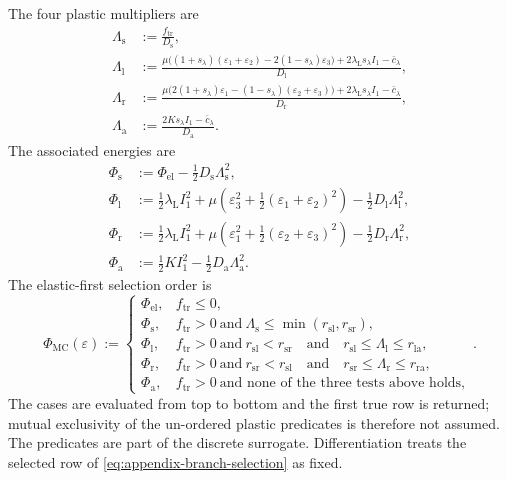 The four plastic multipliers are
\begin{align}
  \Lambda_{\mathrm s}
  &:=\frac{f_{\mathrm{tr}}}{D_{\mathrm s}},
  \nonumber\\
  \Lambda_{\mathrm l}
  &:=\frac{
    \mu\bigl((1+s_\lambda)(\varepsilon_1+\varepsilon_2)
    -2(1-s_\lambda)\varepsilon_3\bigr)
    +2\lambda_{\mathrm L}s_\lambda I_1-\bar c_\lambda}
    {D_{\mathrm l}},
  \nonumber\\
  \Lambda_{\mathrm r}
  &:=\frac{
    \mu\bigl(2(1+s_\lambda)\varepsilon_1
    -(1-s_\lambda)(\varepsilon_2+\varepsilon_3)\bigr)
    +2\lambda_{\mathrm L}s_\lambda I_1-\bar c_\lambda}
    {D_{\mathrm r}},
  \nonumber\\
  \Lambda_{\mathrm a}
  &:=\frac{2Ks_\lambda I_1-\bar c_\lambda}{D_{\mathrm a}}.
  \label{eq:appendix-branch-multipliers}
\end{align}
The associated energies are
\begin{align}
  \Phi_{\mathrm s}
  &:=\Phi_{\mathrm{el}}
    -\frac12D_{\mathrm s}\Lambda_{\mathrm s}^2,
  \nonumber\\
  \Phi_{\mathrm l}
  &:=\frac12\lambda_{\mathrm L}I_1^2
    +\mu\left(\varepsilon_3^2
      +\frac12(\varepsilon_1+\varepsilon_2)^2\right)
    -\frac12D_{\mathrm l}\Lambda_{\mathrm l}^2,
  \nonumber\\
  \Phi_{\mathrm r}
  &:=\frac12\lambda_{\mathrm L}I_1^2
    +\mu\left(\varepsilon_1^2
      +\frac12(\varepsilon_2+\varepsilon_3)^2\right)
    -\frac12D_{\mathrm r}\Lambda_{\mathrm r}^2,
  \nonumber\\
  \Phi_{\mathrm a}
  &:=\frac12KI_1^2
    -\frac12D_{\mathrm a}\Lambda_{\mathrm a}^2.
  \label{eq:appendix-branch-energies}
\end{align}
The elastic-first selection order is
\begin{equation}
  \Phi_{\mathrm{MC}}(\varepsilon)
  :=
  \begin{cases}
    \Phi_{\mathrm{el}},
      & f_{\mathrm{tr}}\le0,\\
    \Phi_{\mathrm s},
      & f_{\mathrm{tr}}>0\ \text{and}\ \Lambda_{\mathrm s}\le
        \min(r_{\mathrm{sl}},r_{\mathrm{sr}}),\\
    \Phi_{\mathrm l},
      & f_{\mathrm{tr}}>0\ \text{and}\ r_{\mathrm{sl}}<r_{\mathrm{sr}}
        \quad\text{and}\quad
        r_{\mathrm{sl}}\le\Lambda_{\mathrm l}\le r_{\mathrm{la}},\\
    \Phi_{\mathrm r},
      & f_{\mathrm{tr}}>0\ \text{and}\ r_{\mathrm{sr}}<r_{\mathrm{sl}}
        \quad\text{and}\quad
        r_{\mathrm{sr}}\le\Lambda_{\mathrm r}\le r_{\mathrm{ra}},\\
    \Phi_{\mathrm a},
      & f_{\mathrm{tr}}>0\ \text{and none of the three tests above holds},
  \end{cases}
  .
  \label{eq:appendix-branch-selection}
\end{equation}
The cases are evaluated from top to bottom and the first true row is returned;
mutual exclusivity of the un-ordered plastic predicates is therefore not
assumed. The predicates are part of the discrete surrogate. Differentiation
treats the selected row of \eqref{eq:appendix-branch-selection} as fixed.

